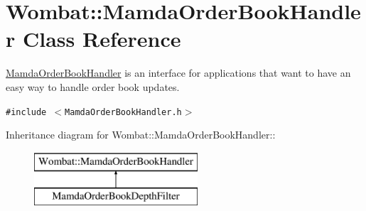 \hypertarget{classWombat_1_1MamdaOrderBookHandler}{
\section{Wombat::Mamda\-Order\-Book\-Handler Class Reference}
\label{classWombat_1_1MamdaOrderBookHandler}
}
\hyperlink{classWombat_1_1MamdaOrderBookHandler}{Mamda\-Order\-Book\-Handler} is an interface for applications that want to have an easy way to handle order book updates.  


{\tt \#include $<$Mamda\-Order\-Book\-Handler.h$>$}

Inheritance diagram for Wombat::Mamda\-Order\-Book\-Handler::\begin{figure}[H]
\begin{center}
\leavevmode
\includegraphics[height=2cm]{classWombat_1_1MamdaOrderBookHandler}
\end{center}
\end{figure}
